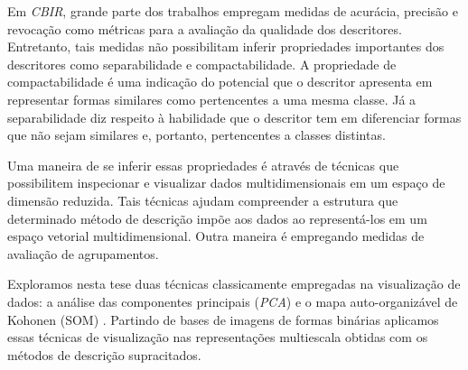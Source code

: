 Em \emph{CBIR}, grande parte dos trabalhos empregam medidas de acurácia, precisão e revocação como métricas para a avaliação da qualidade dos descritores. Entretanto, tais medidas não possibilitam inferir propriedades importantes dos descritores como separabilidade e compactabilidade. A propriedade de compactabilidade é uma indicação do potencial que o descritor apresenta em representar formas similares como pertencentes a uma mesma classe. Já a separabilidade diz respeito à habilidade que o descritor tem em diferenciar formas que não sejam similares e, portanto, pertencentes a classes distintas. 

Uma maneira de se inferir essas propriedades é através de técnicas que possibilitem inspecionar e visualizar dados multidimensionais em um espaço de dimensão reduzida. Tais técnicas ajudam  compreender a estrutura que determinado método de descrição impõe aos dados ao representá-los em um espaço vetorial multidimensional. Outra maneira é empregando medidas de avaliação de agrupamentos. 

Exploramos nesta tese duas técnicas classicamente empregadas na visualização de dados: a análise das componentes principais (\emph{PCA}) e o mapa auto-organizável de Kohonen (SOM) \cite{Kohonen:1982}. Partindo de bases de imagens de formas binárias aplicamos essas técnicas de visualização nas representações multiescala obtidas com os métodos de descrição supracitados.   
 




